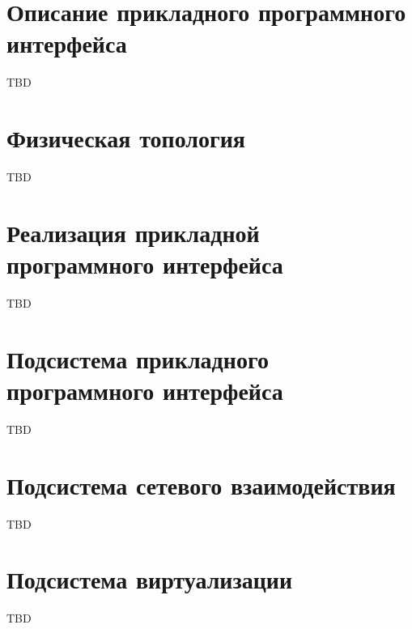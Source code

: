 \section{Описание прикладного программного интерфейса}
TBD

\section{Физическая топология}
TBD

\section{Реализация прикладной программного интерфейса}
TBD

\section{Подсистема прикладного программного интерфейса}
TBD

\section{Подсистема сетевого взаимодействия}
TBD

\section{Подсистема виртуализации}
TBD

